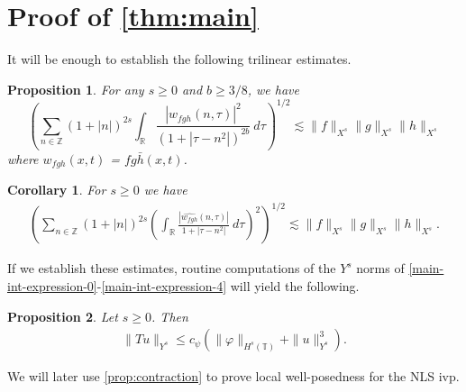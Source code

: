 \documentclass[12pt,reqno]{amsart}
\numberwithin{equation}{section}  %
\numberwithin{figure}{section}
\newcommand{\rr}{\mathbb{R}}
\newcommand{\zz}{\mathbb{Z}}
\newcommand{\ci}{\mathbb{T}}
\newcommand{\wh}{\widehat}
\newcommand{\vp}{\varphi}
\theoremstyle{plain}
\newtheorem{proposition}{Proposition}
\newtheorem{corollary}{Corollary}
\theoremstyle{definition}
\theoremstyle{remark}
\begin{document}
\section{Proof of \autoref{thm:main}}
%
%
%
%
%
%
%
%
%
%
%
%
%
It will be enough to establish the following trilinear estimates.
%
%
%
%
%
%
%
%
\begin{proposition}
\label{prop:trilinear-est}
	For any $s \ge 0$ and $b \ge 3/8$, we have
	\begin{equation}
		\left( \sum_{n \in \zz} \left (1 + |n| \right )^{2s} \int_\rr
		\frac{|\wh{w_{fgh}}(n, \tau) |^2}{\left (1+ |\tau - 
		n^2| \right ) ^{2b}} 
		 \ d \tau 
		\right)^{1/2}
		\lesssim \|f\|_{X^s} \|g\|_{X^s}\|h\|_{X^s}
	\end{equation}
	where $w_{fgh}(x,t)$ = $fg \bar h (x,t)$.
%
%
%
%
\end{proposition}
%
%
%
%
%
%
%
%
%
%
\begin{corollary}
\label{cor:trilinear-estimate2}
	For $s \ge 0$ we have
%
%
\begin{equation}
	\label{trilinear-estimate2}
	\begin{split}
		\left( \sum_{n \in \zz} \left (1 + |n| \right )^{2s}  \left ( \int_\rr 
		\frac{|\wh{w_{fgh}}(n, \tau) |}{1 + | \tau - n^2 |}
		 \ d\tau \right)^2  \right)^{1/2} \lesssim \|f\|_{X^s} \|g\|_{X^s}\|h\|_{X^s}.
	\end{split}
\end{equation}
\end{corollary}
%
%
If we establish these estimates, routine computations of the $Y^s$ norms of
\eqref{main-int-expression-0}-\eqref{main-int-expression-4} will yield the
following.
%
%				 
%
\begin{proposition}
\label{prop:contraction}
	Let $s \ge0$. Then
%
\begin{equation*}
	\begin{split}
		\|Tu\|_{Y^s} \le c_\psi \left( \|\vp \|_{H^s(\ci)} + \|u\|_{Y^s}^3 
		\right).
	\end{split}
\end{equation*}
%
\end{proposition}
We will later use \autoref{prop:contraction} to prove local well-posedness for the 
NLS ivp. %
%
%
\end{document}

